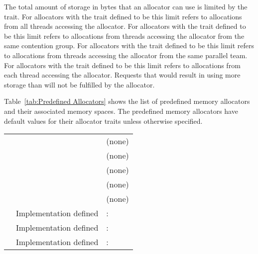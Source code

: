 The total amount of storage in bytes that an allocator can use is limited by the {} trait. For allocators with the  trait defined to be  this limit refers to allocations from all threads accessing the allocator. For allocators with the  trait defined to be  this limit refers to allocations from threads accessing the allocator from the same contention group. For allocators with the  trait defined to be  this limit refers to allocations from threads accessing the allocator from the same parallel team. For allocators with the  trait defined to be  this limit refers to allocations from each thread accessing the allocator. Requests that would result in using more storage than {} will not be fulfilled by the allocator. 

Table~\ref{tab:Predefined Allocators} shows the list of predefined memory allocators and their associated memory spaces. The predefined memory allocators have default values for their allocator traits unless otherwise specified.

\nolinenumbers
\renewcommand{\arraystretch}{1.5}
\tablelasttail{\hline}
\begin{supertabular}{p{1.8in}p{2in}p{1.2in}}
{} & {} & (none)\\
{} & {} & (none)\\
{} & {}& (none)\\
{} & {} & (none)\\
{} & {} & (none)\\
{} & Implementation defined & {}:{}\\
{} & Implementation defined & {}:{}\\
{} & Implementation defined & {}:{}\\
\end{supertabular}
\linenumbers

